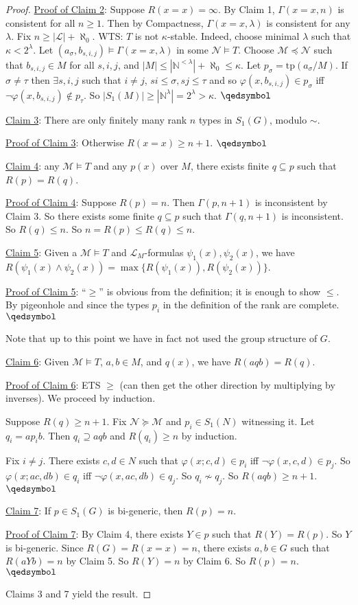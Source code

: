 \documentclass[]{article}
\theoremstyle{custhm}
\theoremstyle{cusdef}
\theoremstyle{custhm}
\theoremstyle{custhm}
\theoremstyle{custhm}
\theoremstyle{ex}
\theoremstyle{custhm}
\theoremstyle{cusdef}
\theoremstyle{remark}
\theoremstyle{remark}
\theoremstyle{numremark}
\renewcommand{\L}{\mathcal{L}}
\newcommand{\M}{\mathcal{M}}
\renewcommand{\phi}{\varphi}
\newcommand{\tp}{\textrm{tp}}
\newcommand{\N}{\mathcal{N}}
\renewcommand{\subset}{\subseteq}
\begin{document}
\begin{proof}
\underline{Proof of Claim 2}: Suppose $R(x=x) = \infty$. By Claim 1, $\Gamma(x=x,n)$ is consistent for all $n\ge1$. Then by Compactness, $\Gamma(x=x,\lambda)$ is consistent for any $\lambda$. Fix $n\ge |\L| + \aleph_0$. WTS: $T$ is not $\kappa$-stable. Indeed, choose minimal $\lambda$ such that $\kappa < 2^\lambda$. Let $(a_\sigma,b_{s,i,j})\models \Gamma(x=x,\lambda)$ in some $\N\models T$. Choose $\M\preceq \N$ such that $b_{s,i,j}\in M$ for all $s,i,j$, and $|M| \le |\mathbb{N}^{<\lambda}| + \aleph_0 \le \kappa$. Let $p_\sigma = \tp(a_\sigma/M)$. If $\sigma\ne \tau$ then $\exists s,i,j$ such that $i\ne j$, $si\le \sigma, sj\le \tau$ and so $\phi(x,b_{s,i,j}) \in p_\sigma$ iff $\neg \phi(x,b_{s,i,j})\not\in p_\tau$. So $|S_1(M)| \ge |\mathbb{N}^\lambda| = 2^{\lambda} > \kappa$. $\qedsymbol$

\underline{Claim 3}: There are only finitely many rank $n$ types in $S_1(G)$, modulo $\sim$.

\underline{Proof of Claim 3}: Otherwise $R(x=x) \ge n+1$. $\qedsymbol$

\underline{Claim 4}: any $\M\models T$ and any $p(x)$ over $M$, there exists finite $q\subset p$ such that $R(p) = R(q)$.

\underline{Proof of Claim 4}: Suppose $R(p) = n$. Then $\Gamma(p,n+1)$ is inconsistent by Claim 3. So there exists some finite $q\subset p$ such that $\Gamma(q,n+1)$ is inconsistent. So $R(q)\le n$. So $n = R(p) \le R(q) \le n$. \qedsymbol

\underline{Claim 5}: Given a $\M \models T$ and $\L_M$-formulas $\psi_1(x),\psi_2(x)$, we have $R(\psi_1(x)\land\psi_2(x)) = \max\{R(\psi_1(x)),R(\psi_2(x))\}$.

\underline{Proof of Claim 5}: ``$\ge$'' is obvious from the definition; it is enough to show $\le$. By pigeonhole and since the types $p_i$ in the definition of the rank are complete. $\qedsymbol$

Note that up to this point we have in fact not used the group structure of $G$.

\underline{Claim 6}: Given $\M\models T$, $a,b\in M$, and $q(x)$, we have $R(aqb) = R(q)$.

\underline{Proof of Claim 6}: ETS $\ge$ (can then get the other direction by multiplying by inverses). We proceed by induction.

Suppose $R(q)\ge n+1$. Fix $\N\succeq \M$ and $p_i \in S_1(N)$ witnessing it. Let $q_i = ap_i b$. Then $q_i\supseteq aqb$ and $R(q_i) \ge n$ by induction.

Fix $i\ne j$. There exists $c,d \in N$ such that $\phi(x;c,d) \in p_i$ iff $\neg \phi(x,c,d) \in p_j$. So $\phi(x;ac,db)\in q_i$ iff $\neg\phi(x,ac,db)\in q_j$. So $q_i\not\sim q_j$. So $R(aqb) \ge n+1$. $\qedsymbol$

\underline{Claim 7}: If $p \in S_1(G)$ is bi-generic, then $R(p) = n$.

\underline{Proof of Claim 7}: By Claim 4, there exists $Y \in p$ such that $R(Y) = R(p)$. So $Y$ is bi-generic. Since $R(G) = R(x=x) = n$, there exists $a,b\in G$ such that $R(aYb) = n$ by Claim 5. So $R(Y) = n$ by Claim 6. So $R(p) = n$. $\qedsymbol$

Claims 3 and 7 yield the result.
\end{proof}
\end{document}
